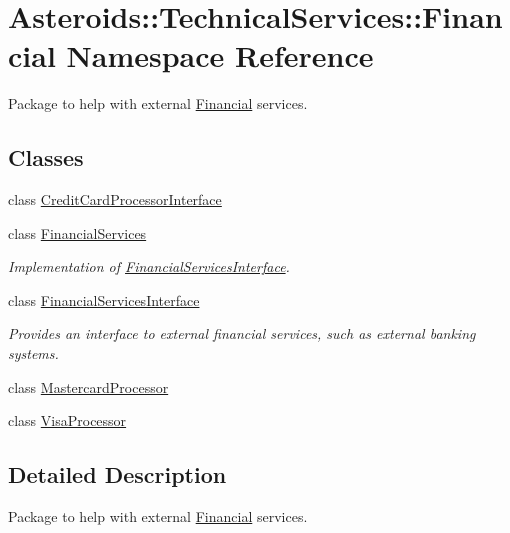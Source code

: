 \hypertarget{namespaceAsteroids_1_1TechnicalServices_1_1Financial}{}\section{Asteroids\+:\+:Technical\+Services\+:\+:Financial Namespace Reference}
\label{namespaceAsteroids_1_1TechnicalServices_1_1Financial}


Package to help with external \hyperlink{namespaceAsteroids_1_1TechnicalServices_1_1Financial}{Financial} services.  


\subsection*{Classes}
\begin{DoxyCompactItemize}
\item 
class \hyperlink{classAsteroids_1_1TechnicalServices_1_1Financial_1_1CreditCardProcessorInterface}{Credit\+Card\+Processor\+Interface}
\item 
class \hyperlink{classAsteroids_1_1TechnicalServices_1_1Financial_1_1FinancialServices}{Financial\+Services}
\begin{DoxyCompactList}\small\item\em Implementation of \hyperlink{classAsteroids_1_1TechnicalServices_1_1Financial_1_1FinancialServicesInterface}{Financial\+Services\+Interface}. \end{DoxyCompactList}\item 
class \hyperlink{classAsteroids_1_1TechnicalServices_1_1Financial_1_1FinancialServicesInterface}{Financial\+Services\+Interface}
\begin{DoxyCompactList}\small\item\em Provides an interface to external financial services, such as external banking systems. \end{DoxyCompactList}\item 
class \hyperlink{classAsteroids_1_1TechnicalServices_1_1Financial_1_1MastercardProcessor}{Mastercard\+Processor}
\item 
class \hyperlink{classAsteroids_1_1TechnicalServices_1_1Financial_1_1VisaProcessor}{Visa\+Processor}
\end{DoxyCompactItemize}


\subsection{Detailed Description}
Package to help with external \hyperlink{namespaceAsteroids_1_1TechnicalServices_1_1Financial}{Financial} services. 